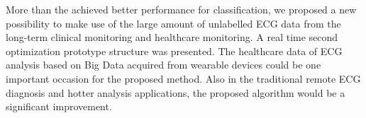 \documentclass[journal]{IEEEtran}
\begin{document}
More than the achieved better performance for classification, we proposed a new possibility to make use of the large amount of unlabelled ECG data from the long-term clinical monitoring and healthcare monitoring. A real time second optimization prototype structure was presented. The healthcare data of ECG analysis based on Big Data acquired from wearable devices could be one important occasion for the proposed method. Also in the traditional remote ECG diagnosis and hotter analysis applications, the proposed algorithm would be a significant improvement.




%
%

\end{document}
